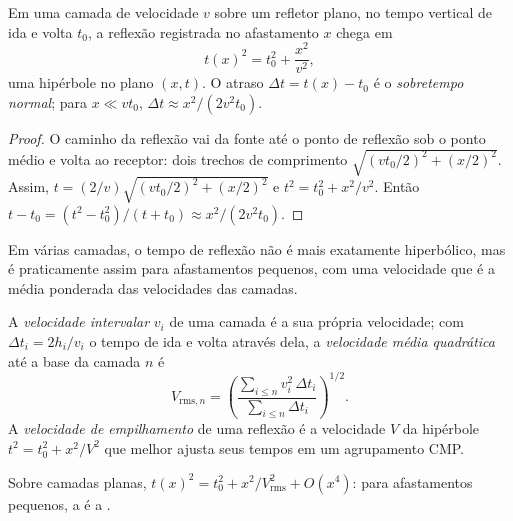 \begin{theorem}\label{thm:b3:exploration-seismology:nmo}
Em uma camada de velocidade $v$ sobre um refletor plano, no tempo vertical de ida e volta
$t_0$, a reflexão registrada no afastamento $x$ chega em
\[
  t(x)^2 = t_0^2 + \frac{x^2}{v^2},
\]
uma hipérbole no plano $(x, t)$. O atraso $\Delta t = t(x) - t_0$ é o
\emph{sobretempo normal}; para $x \ll vt_0$,
$\Delta t \approx x^2/(2v^2t_0)$.
\end{theorem}

\begin{proof}
O caminho da reflexão vai da fonte até o ponto de reflexão sob o
ponto médio e volta ao receptor: dois trechos de comprimento
$\sqrt{(vt_0/2)^2 + (x/2)^2}$. Assim, $t = (2/v)\sqrt{(vt_0/2)^2 + (x/2)^2}$ e
$t^2 = t_0^2 + x^2/v^2$. Então $t - t_0 = (t^2 - t_0^2)/(t + t_0) \approx
x^2/(2v^2t_0)$.
\end{proof}

Em várias camadas, o tempo de reflexão não é mais exatamente hiperbólico, mas é
praticamente assim para afastamentos pequenos, com uma velocidade que é a média ponderada das
velocidades das camadas.

\begin{definition}\label{def:b3:exploration-seismology:velocities}
A \emph{velocidade intervalar} $v_i$ de uma camada é a sua
própria velocidade; com $\Delta t_i = 2h_i/v_i$ o tempo de ida e volta através dela, a
\emph{velocidade média quadrática} até a
base da camada $n$ é
\[
  V_{\text{rms},n} = \left(\frac{\sum_{i\le n}v_i^2\,\Delta t_i}{\sum_{i\le n}\Delta t_i}\right)^{1/2}.
\]
A \emph{velocidade de empilhamento} de uma reflexão é a
velocidade $V$ da hipérbole $t^2 = t_0^2 + x^2/V^2$ que melhor ajusta seus tempos em um
agrupamento CMP.
\end{definition}

\begin{proposition}\label{prop:b3:exploration-seismology:rms}
Sobre camadas planas, $t(x)^2 = t_0^2 + x^2/V_{\text{rms}}^2 + O(x^4)$: para
afastamentos pequenos, a  é a .
\end{proposition}

